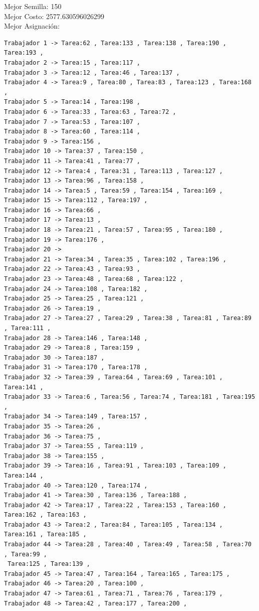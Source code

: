 \documentclass{article}
\begin{document}
Mejor Semilla: 150\\
Mejor Costo: 2577.630596026299\\
Mejor Asignación: 
\begin{lstlisting}
Trabajador 1 -> Tarea:62 , Tarea:133 , Tarea:138 , Tarea:190 , Tarea:193 , 
Trabajador 2 -> Tarea:15 , Tarea:117 , 
Trabajador 3 -> Tarea:12 , Tarea:46 , Tarea:137 , 
Trabajador 4 -> Tarea:9 , Tarea:80 , Tarea:83 , Tarea:123 , Tarea:168 , 
Trabajador 5 -> Tarea:14 , Tarea:198 , 
Trabajador 6 -> Tarea:33 , Tarea:63 , Tarea:72 , 
Trabajador 7 -> Tarea:53 , Tarea:107 , 
Trabajador 8 -> Tarea:60 , Tarea:114 , 
Trabajador 9 -> Tarea:156 , 
Trabajador 10 -> Tarea:37 , Tarea:150 , 
Trabajador 11 -> Tarea:41 , Tarea:77 , 
Trabajador 12 -> Tarea:4 , Tarea:31 , Tarea:113 , Tarea:127 , 
Trabajador 13 -> Tarea:96 , Tarea:158 , 
Trabajador 14 -> Tarea:5 , Tarea:59 , Tarea:154 , Tarea:169 , 
Trabajador 15 -> Tarea:112 , Tarea:197 , 
Trabajador 16 -> Tarea:66 , 
Trabajador 17 -> Tarea:13 , 
Trabajador 18 -> Tarea:21 , Tarea:57 , Tarea:95 , Tarea:180 , 
Trabajador 19 -> Tarea:176 , 
Trabajador 20 -> 
Trabajador 21 -> Tarea:34 , Tarea:35 , Tarea:102 , Tarea:196 , 
Trabajador 22 -> Tarea:43 , Tarea:93 , 
Trabajador 23 -> Tarea:48 , Tarea:68 , Tarea:122 , 
Trabajador 24 -> Tarea:108 , Tarea:182 , 
Trabajador 25 -> Tarea:25 , Tarea:121 , 
Trabajador 26 -> Tarea:19 , 
Trabajador 27 -> Tarea:27 , Tarea:29 , Tarea:38 , Tarea:81 , Tarea:89 , Tarea:111 , 
Trabajador 28 -> Tarea:146 , Tarea:148 , 
Trabajador 29 -> Tarea:8 , Tarea:159 , 
Trabajador 30 -> Tarea:187 , 
Trabajador 31 -> Tarea:170 , Tarea:178 , 
Trabajador 32 -> Tarea:39 , Tarea:64 , Tarea:69 , Tarea:101 , Tarea:141 , 
Trabajador 33 -> Tarea:6 , Tarea:56 , Tarea:74 , Tarea:181 , Tarea:195 , 
Trabajador 34 -> Tarea:149 , Tarea:157 , 
Trabajador 35 -> Tarea:26 , 
Trabajador 36 -> Tarea:75 , 
Trabajador 37 -> Tarea:55 , Tarea:119 , 
Trabajador 38 -> Tarea:155 , 
Trabajador 39 -> Tarea:16 , Tarea:91 , Tarea:103 , Tarea:109 , Tarea:144 , 
Trabajador 40 -> Tarea:120 , Tarea:174 , 
Trabajador 41 -> Tarea:30 , Tarea:136 , Tarea:188 , 
Trabajador 42 -> Tarea:17 , Tarea:22 , Tarea:153 , Tarea:160 , Tarea:162 , Tarea:163 , 
Trabajador 43 -> Tarea:2 , Tarea:84 , Tarea:105 , Tarea:134 , Tarea:161 , Tarea:185 , 
Trabajador 44 -> Tarea:28 , Tarea:40 , Tarea:49 , Tarea:58 , Tarea:70 , Tarea:99 ,
 Tarea:125 , Tarea:139 , 
Trabajador 45 -> Tarea:47 , Tarea:164 , Tarea:165 , Tarea:175 , 
Trabajador 46 -> Tarea:20 , Tarea:100 , 
Trabajador 47 -> Tarea:61 , Tarea:71 , Tarea:76 , Tarea:179 , 
Trabajador 48 -> Tarea:42 , Tarea:177 , Tarea:200 , 

\end{lstlisting}
\end{document}
